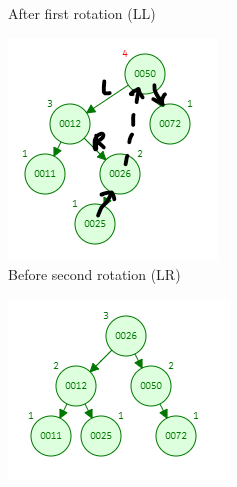 \documentclass[12pt, a4paper]{article}
\begin{document}
\begin{enumerate}
\begin{figure}[h!]
\begin{subfigure}[b]{0.3\textwidth}
        \caption{After first rotation (LL)}
        \label{fig:1-1-b}
      \end{subfigure}
      \hfill
      \begin{subfigure}[b]{0.3\textwidth}
        \centering
        \includegraphics[width=\textwidth]{1-2-a}
        \caption{Before second rotation (LR)}
        \label{fig:1-2-a}
      \end{subfigure}
      \hfill
      \begin{subfigure}[b]{0.3\textwidth}
        \centering
        \includegraphics[width=\textwidth]{1-2-b}

\end{subfigure}
\end{figure}
\end{enumerate}
\end{document}
